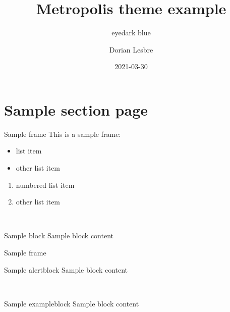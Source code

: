 \documentclass[14pt]{beamer}
\title{Metropolis theme example}
\subtitle{eyedark blue}
\author{Dorian Lesbre}
\date{2021-03-30}
\begin{document}
\begin{frame}
	\titlepage
\end{frame}

\section{Sample section page}

\begin{frame}{Sample frame}
	This is a sample frame:
	\begin{multicols}{2}
		\begin{itemize}
			\item list item
			\item other list item
		\end{itemize}
		\begin{enumerate}
			\item numbered list item
			\item other list item
		\end{enumerate}
	\end{multicols}
	~\\
	\begin{block}{Sample block}
		Sample block content
	\end{block}
\end{frame}

\begin{frame}{Sample frame}

	\begin{alertblock}{Sample alertblock}
		Sample block content
	\end{alertblock}
	~\\
	\begin{exampleblock}{Sample exampleblock}
		Sample block content
	\end{exampleblock}
\end{frame}
\end{document}
